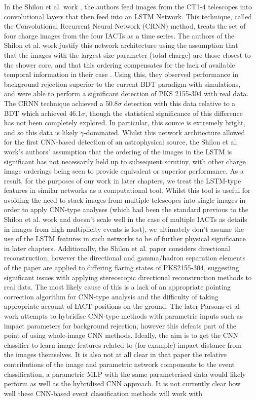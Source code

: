 In the Shilon et al. work \cite{Shilon}, the authors feed images from the CT1-4 telescopes into convolutional layers that then feed into an LSTM Network. This technique, called the Convolutional Recurrent Neural Network (CRNN) method, treats the set of four charge images from the four IACTs as a time series. The authors of the Shilon et al. work justify this network architecture using the assumption that that the images with the largest size parameter (total charge) are those closest to the shower core, and that this ordering compensates for the lack of available temporal information in their case \cite{Shilon}. Using this, they observed performance in background rejection superior to the current BDT paradigm with simulations, and were able to perform a significant detection of PKS 2155-304 with real data. The CRNN technique achieved a 50.8$\sigma$ detection with this data relative to a BDT which achieved 46.1$\sigma$, though the statistical significance of this difference has not been completely explored. In particular, this source is extremely bright, and so this data is likely $\gamma$-dominated. Whilst this network architecture allowed for the first CNN-based detection of an astrophysical source, the Shilon et al. work's authors' assumption that the ordering of the images in the LSTM is significant has not necessarily held up to subsequent scrutiny, with other charge image orderings \cite{ariconf} being seen to provide equivalent or superior performance. As a result, for the purposes of our work in later chapters, we treat the LSTM-type features in similar networks as a computational tool. Whilst this tool is useful for avoiding the need to stack images from multiple telescopes into single images in order to apply CNN-type analyses (which had been the standard previous to the Shilon et al. work and doesn't scale well in the case of multiple IACTs \cite{Shilon}\cite{salvatore} as details in images from high multiplicity events is lost), we ultimately don't assume the use of the LSTM features in such networks to be of further physical significance in later chapters. Additionally, the Shilon et al. paper considers directional reconstruction, however the directional and gamma/hadron separation elements of the paper are applied to differing flaring states of PKS2155-304, suggesting significant issues with applying stereoscopic directional reconstruction methods to real data. The most likely cause of this is a lack of an appropriate pointing correction algorithm for CNN-type analysis and the difficulty of taking appropriate account of IACT positions on the ground. The later Parsons et al \cite{ParsonsOhm} work attempts to hybridise CNN-type methods with parametric inputs such as impact parameters for background rejection, however this defeats part of the point of using whole-image CNN methods. Ideally, the aim is to get the CNN classifier to learn image features related to (for example) impact distance from the images themselves. It is also not at all clear in that paper the relative contributions of the image and parametric network components to the event classification, a parametric MLP with the same parameterised data would likely perform as well as the hybridised CNN approach. It is not currently clear how well these CNN-based event classification methods will work with 